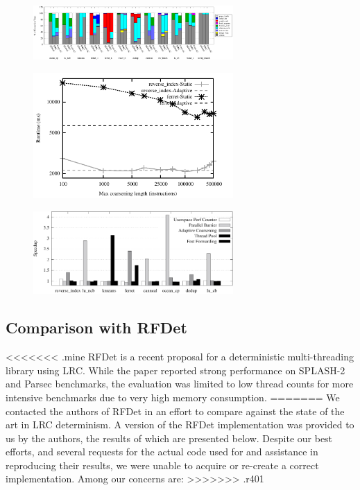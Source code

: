 \begin{figure}
\includegraphics[width=3.0in]{figures/fine_grained_analysis.pdf}
\caption{}
\label{f:fine-grained}
\end{figure}


\begin{figure}
\includegraphics[width=3.0in]{figures/adaptive.pdf}
\caption{}
\label{f:adaptive}
\end{figure}


\begin{figure}
\includegraphics[width=3.0in]{figures/optimizations.pdf}
\caption{}
\label{f:adaptive}
\end{figure}

\subsection{Comparison with RFDet}

<<<<<<< .mine
RFDet\cite{rfdet} is a recent proposal for a deterministic multi-threading library using LRC. While the paper reported strong performance on SPLASH-2 and Parsec benchmarks, the evaluation was limited to low thread counts for more intensive benchmarks due to very high memory consumption.
=======
We contacted the authors of RFDet \cite{kai_lu_efficient_2014} in an effort to compare \lib{} against the state of the art in LRC determinism. A version of the RFDet implementation was provided to us by the authors, the results of which are presented below. Despite our best efforts, and several requests for the actual code used for \cite{kai_lu_efficient_2014} and assistance in reproducing their results, we were unable to acquire or re-create a correct implementation. Among our concerns are:
>>>>>>> .r401

